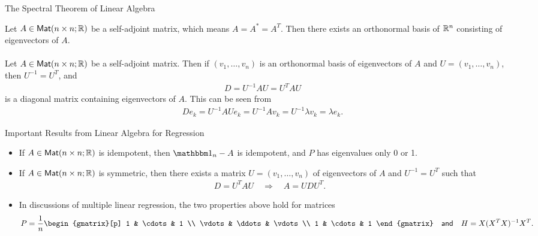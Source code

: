 \begin{frame}{The Spectral Theorem of Linear Algebra}

\justifying
{} Let $A \in \mathsf{Mat}(n\times n; \mathbb{R})$ be a self-adjoint matrix, which means $A = A^* = A^T$. Then there exists an orthonormal basis of $\mathbb{R}^n$ consisting of eigenvectors of $A$. \\
~\\
 Let $A \in \mathsf{Mat}(n\times n; \mathbb{R})$ be a self-adjoint matrix. Then if $(v_1, \ldots, v_n)$ is an orthonormal basis of eigenvectors of $A$ and $U = (v_1, \ldots, v_n)$, then $U^{-1} = U^T$, and
\begin{align*}
D = U^{-1}AU = U^{T} AU
\end{align*}
is a diagonal matrix containing eigenvectors of $A$. This can be seen from
\begin{align*}
De_k = U^{-1}AUe_k = U^{-1}Av_k = U^{-1}\lambda v_k = \lambda e_k.
\end{align*}

\end{frame}

\begin{frame}{Important Results from Linear Algebra for Regression}

\begin{itemize}
	\justifying
	\item If $A\in \mathsf{Mat}(n\times n; \mathbb{R})$ is idempotent, then $\bbone_n-A$ is idempotent, and $P$ has eigenvalues only 0 or 1.
	\item If $A\in \mathsf{Mat}(n\times n; \mathbb{R})$ is symmetric, then there exists a matrix $U = (v_1, \ldots, v_n)$ of eigenvectors of $A$ and $U^{-1} = U^T$ such that
	\begin{align*}
	D = U^{T}AU \quad\Rightarrow\quad A = UDU^T.
	\end{align*}
	\item In discussions of multiple linear regression, the two properties above hold for matrices
	\begin{align*}
	P = \frac{1}{n}\begin{gmatrix}[p]
	1 & \cdots & 1 \\
	\vdots & \ddots & \vdots \\
	1 & \cdots & 1
	\end{gmatrix} \quad \U{and}\quad H = X(X^TX)^{-1}X^T.
	\end{align*}
\end{itemize}

\end{frame}


